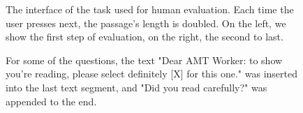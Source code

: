 \begin{figure}
    \center
    \caption{The interface of the task used for human evaluation. Each time the user presses next, the passage's length is doubled. On the left, we show the first step of evaluation, on the right, the second to last.}
    \label{fig:amt_screenshot} 
\end{figure}

\begin{figure}
    \center
    \caption{For some of the questions, the text "Dear AMT Worker: to show you're reading, please select definitely [X] for this one." was inserted into the last text segment, and "Did you read carefully?" was appended to the end.}
    \label{fig:amt_honeypot} 
\end{figure}

